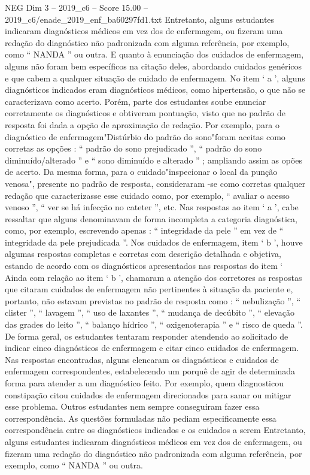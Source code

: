 \begin{textsample}{NEG Dim 3 – 2019\_c6 – Score 15.00 – 2019\_c6/enade\_2019\_enf\_ba60297fd1.txt}
Entretanto, alguns estudantes indicaram diagnósticos médicos em vez dos de enfermagem, ou fizeram uma redação do diagnóstico não padronizada com alguma referência, por exemplo, como “ NANDA ” ou outra.
E quanto à enunciação dos cuidados de enfermagem, alguns não foram bem específicos na citação deles, abordando cuidados genéricos e que cabem a qualquer situação de cuidado de enfermagem.
No item ‘ a ’, alguns diagnósticos indicados eram diagnósticos médicos, como hipertensão, o que não se caracterizava como acerto.
Porém, parte dos estudantes soube enunciar corretamente os diagnósticos e obtiveram pontuação, visto que no padrão de resposta foi dada a opção de aproximação de redação.
Por exemplo, para o diagnóstico de enfermagem"Distúrbio do padrão do sono"foram aceitas como corretas as opções : “ padrão do sono prejudicado ”, “ padrão do sono diminuído/alterado ” e “ sono diminuído e alterado ” ; ampliando assim as opões de acerto.
Da mesma forma, para o cuidado"inspecionar o local da punção venosa", presente no padrão de resposta, consideraram -se como corretas qualquer redação que caracterizasse esse cuidado como, por exemplo, “ avaliar o acesso venoso ”, “ ver se há infecção no cateter ”, etc.
Nas respostas ao item ‘ a ’, cabe ressaltar que alguns denominavam de forma incompleta a categoria diagnóstica, como, por exemplo, escrevendo apenas : “ integridade da pele ” em vez de “ integridade da pele prejudicada ”.
Nos cuidados de enfermagem, item ‘ b ’, houve algumas respostas completas e corretas com descrição detalhada e objetiva, estando de acordo com os diagnósticos apresentados nas respostas do item ‘ Ainda com relação ao item ‘ b ’, chamaram a atenção dos corretores as respostas que citaram cuidados de enfermagem não pertinentes à situação da paciente e, portanto, não estavam previstas no padrão de resposta como : “ nebulização ”, “ clister ”, “ lavagem ”, “ uso de laxantes ”, “ mudança de decúbito ”, “ elevação das grades do leito ”, “ balanço hídrico ”, “ oxigenoterapia ” e “ risco de queda ”.
De forma geral, os estudantes tentaram responder atendendo ao solicitado de indicar cinco diagnósticos de enfermagem e citar cinco cuidados de enfermagem.
Nas respostas encontradas, alguns elencaram os diagnósticos e cuidados de enfermagem correspondentes, estabelecendo um porquê de agir de determinada forma para atender a um diagnóstico feito.
Por exemplo, quem diagnosticou constipação citou cuidados de enfermagem direcionados para sanar ou mitigar esse problema.
Outros estudantes nem sempre conseguiram fazer essa correspondência.
As questões formuladas não pediam especificamente essa correspondência entre os diagnósticos indicados e os cuidados a serem Entretanto, alguns estudantes indicaram diagnósticos médicos em vez dos de enfermagem, ou fizeram uma redação do diagnóstico não padronizada com alguma referência, por exemplo, como “ NANDA ” ou outra.

\end{textsample}

